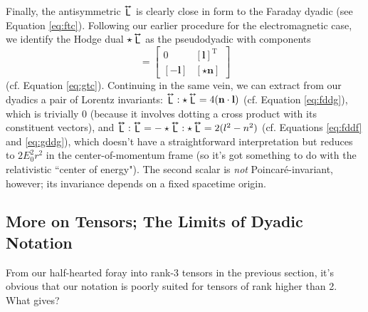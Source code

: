 \documentclass[12pt]{article}
\renewcommand{\vv}[1]{\mathbf{#1}}
\newcommand{\tightoverset}[2]{%
  \mathop{#2}\limits^{\vbox to -.5ex{\kern-0.75ex\hbox{$#1$}\vss}}}
\newcommand{\inlinedy}[1]{\tightoverset{\text{\tiny$\bm\leftrightarrow$}}{#1}}
\newcommand{\capdy}[1]{ \overset{ \text{\tiny$\bm\leftrightarrow$} }{\vphantom{\text{\small{A}}}\smash{#1}} }
\begin{document}
Finally, the antisymmetric $\inlinedy{\mathsf{L}}$ is clearly close in form to the Faraday dyadic (see Equation \ref{eq:ftc}). Following our earlier procedure for the electromagnetic case, we identify the Hodge dual $\star \inlinedy{\mathsf{L}}$ as the pseudodyadic with components
\begin{equation*}
[ \star \capdy{\mathsf{L}} ]
=
\begin{bmatrix}
0 & [ \vv l ]^\mathrm{T} \\[1ex]
[ - \vv l ] & [ \star \vv n ]
\end{bmatrix}
\end{equation*}
(cf. Equation \ref{eq:gtc}). Continuing in the same vein, we can extract from our dyadics a pair of Lorentz invariants: $\inlinedy{\mathsf{L}} : \star \inlinedy{\mathsf{L}} =  4 ( \vv n \cdot \vv l )$ (cf. Equation \ref{eq:fddg}), which is trivially $0$ (because it involves dotting a cross product with its constituent vectors), and $\inlinedy{\mathsf{L}} : \inlinedy{\mathsf{L}} = - \star \inlinedy{\mathsf{L}} : \star \inlinedy{\mathsf{L}} = 2 ( l^2 - n^2 )$ (cf. Equations \ref{eq:fddf} and \ref{eq:gddg}), which doesn't have a straightforward interpretation but reduces to $2E_0^2 r^2$ in the center-of-momentum frame (so it's got something to do with the relativistic ``center of energy"). The second scalar is \emph{not} Poincar\'e-invariant, however; its invariance depends on a fixed spacetime origin.


\subsection{More on Tensors; The Limits of Dyadic Notation}\label{sssec:index}

From our half-hearted foray into rank-3 tensors in the previous section, it's obvious that our notation is poorly suited for tensors of rank higher than 2. What gives?
\end{document}
